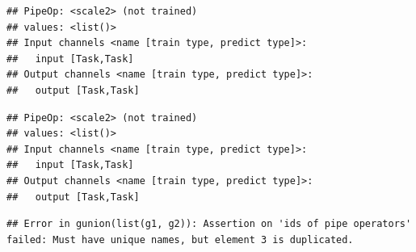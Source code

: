 \documentclass[]{scrbook}
\newenvironment{Shaded}{\begin{snugshade}}{\end{snugshade}}
\newcommand{\DataTypeTok}[1]{\textcolor[rgb]{0.13,0.29,0.53}{#1}}
\newcommand{\KeywordTok}[1]{\textcolor[rgb]{0.13,0.29,0.53}{\textbf{#1}}}
\newcommand{\NormalTok}[1]{#1}
\newcommand{\OperatorTok}[1]{\textcolor[rgb]{0.81,0.36,0.00}{\textbf{#1}}}
\newcommand{\StringTok}[1]{\textcolor[rgb]{0.31,0.60,0.02}{#1}}
\renewenvironment{Shaded} {\begin{snugshade}\small} {\end{snugshade}}
\begin{document}
\begin{Shaded}
\end{Shaded}

\begin{verbatim}
## PipeOp: <scale2> (not trained)
## values: <list()>
## Input channels <name [train type, predict type]>:
##   input [Task,Task]
## Output channels <name [train type, predict type]>:
##   output [Task,Task]
\end{verbatim}

\begin{Shaded}
\end{Shaded}

\begin{verbatim}
## PipeOp: <scale2> (not trained)
## values: <list()>
## Input channels <name [train type, predict type]>:
##   input [Task,Task]
## Output channels <name [train type, predict type]>:
##   output [Task,Task]
\end{verbatim}

\begin{Shaded}
\end{Shaded}

\begin{verbatim}
## Error in gunion(list(g1, g2)): Assertion on 'ids of pipe operators' failed: Must have unique names, but element 3 is duplicated.
\end{verbatim}

\begin{Shaded}
\end{Shaded}
\end{document}
